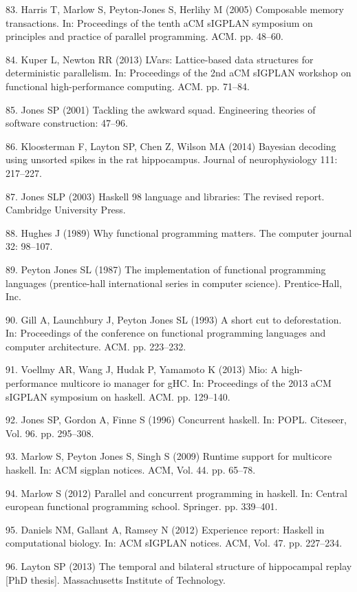 \documentclass[]{article}
\begin{document}
83. Harris T, Marlow S, Peyton-Jones S, Herlihy M (2005) Composable
memory transactions. In: Proceedings of the tenth aCM sIGPLAN symposium
on principles and practice of parallel programming. ACM. pp. 48--60.

84. Kuper L, Newton RR (2013) LVars: Lattice-based data structures for
deterministic parallelism. In: Proceedings of the 2nd aCM sIGPLAN
workshop on functional high-performance computing. ACM. pp. 71--84.

85. Jones SP (2001) Tackling the awkward squad. Engineering theories of
software construction: 47--96.

86. Kloosterman F, Layton SP, Chen Z, Wilson MA (2014) Bayesian decoding
using unsorted spikes in the rat hippocampus. Journal of neurophysiology
111: 217--227.

87. Jones SLP (2003) Haskell 98 language and libraries: The revised
report. Cambridge University Press.

88. Hughes J (1989) Why functional programming matters. The computer
journal 32: 98--107.

89. Peyton Jones SL (1987) The implementation of functional programming
languages (prentice-hall international series in computer science).
Prentice-Hall, Inc.

90. Gill A, Launchbury J, Peyton Jones SL (1993) A short cut to
deforestation. In: Proceedings of the conference on functional
programming languages and computer architecture. ACM. pp. 223--232.

91. Voellmy AR, Wang J, Hudak P, Yamamoto K (2013) Mio: A
high-performance multicore io manager for gHC. In: Proceedings of the
2013 aCM sIGPLAN symposium on haskell. ACM. pp. 129--140.

92. Jones SP, Gordon A, Finne S (1996) Concurrent haskell. In: POPL.
Citeseer, Vol. 96. pp. 295--308.

93. Marlow S, Peyton Jones S, Singh S (2009) Runtime support for
multicore haskell. In: ACM sigplan notices. ACM, Vol. 44. pp. 65--78.

94. Marlow S (2012) Parallel and concurrent programming in haskell. In:
Central european functional programming school. Springer. pp. 339--401.

95. Daniels NM, Gallant A, Ramsey N (2012) Experience report: Haskell in
computational biology. In: ACM sIGPLAN notices. ACM, Vol. 47. pp.
227--234.

96. Layton SP (2013) The temporal and bilateral structure of hippocampal
replay {[}PhD thesis{]}. Massachusetts Institute of Technology.
\end{document}
